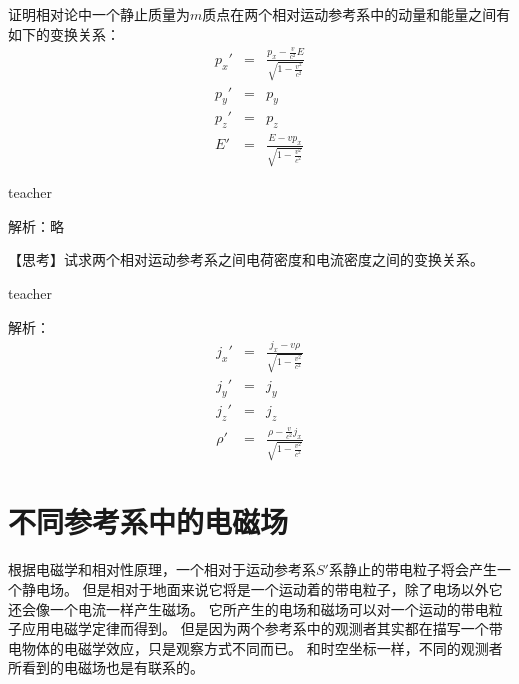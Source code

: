 \begin{example}

证明相对论中一个静止质量为$m$质点在两个相对运动参考系中的动量和能量之间有如下的变换关系：
\begin{eqnarray*}
p_x' &=& \frac{p_x-\frac{v}{c^2}E}{\sqrt{1-\frac{v^2}{c^2}}}\\
p_y' &=& p_y\\
p_z' &=& p_z\\
E' & = & \frac{E-vp_x}{\sqrt{1-\frac{v^2}{c^2}}}
\end{eqnarray*}
\begin{taggedblock}{teacher}
\noindent

解析：略
\end{taggedblock}
\end{example}





\begin{example}

【思考】试求两个相对运动参考系之间电荷密度和电流密度之间的变换关系。
\begin{taggedblock}{teacher}
\noindent

解析：
\begin{eqnarray*}
j_x' &=& \frac{j_x-v \rho}{\sqrt{1-\frac{v^2}{c^2}}}\\
j_y' &=& j_y\\
j_z' &=& j_z\\
\rho' & = & \frac{\rho-\frac{v}{c^2}j_x}{\sqrt{1-\frac{v^2}{c^2}}}
\end{eqnarray*}
\end{taggedblock}
\end{example}




\section{不同参考系中的电磁场}
根据电磁学和相对性原理，一个相对于运动参考系$S'$系静止的带电粒子将会产生一个静电场。
但是相对于地面来说它将是一个运动着的带电粒子，除了电场以外它还会像一个电流一样产生磁场。
它所产生的电场和磁场可以对一个运动的带电粒子应用电磁学定律而得到。
但是因为两个参考系中的观测者其实都在描写一个带电物体的电磁学效应，只是观察方式不同而已。
和时空坐标一样，不同的观测者所看到的电磁场也是有联系的。

